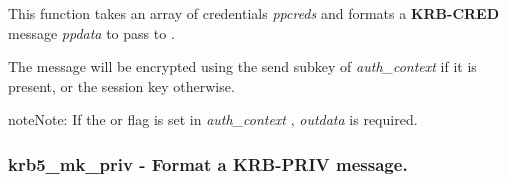 \documentclass[letterpaper,10pt,english]{sphinxmanual}
\begin{document}
This function takes an array of credentials \emph{ppcreds} and formats a \textbf{KRB-CRED} message \emph{ppdata} to pass to {\hyperref[appdev/refs/api/krb5_rd_cred:c.krb5_rd_cred]{}} .

The message will be encrypted using the send subkey of \emph{auth\_context} if it is present, or the session key otherwise.

\begin{notice}{note}{Note:}
If the {\hyperref[appdev/refs/macros/KRB5_AUTH_CONTEXT_RET_TIME:KRB5_AUTH_CONTEXT_RET_TIME]{}} or {\hyperref[appdev/refs/macros/KRB5_AUTH_CONTEXT_RET_SEQUENCE:KRB5_AUTH_CONTEXT_RET_SEQUENCE]{}} flag is set in \emph{auth\_context} , \emph{outdata} is required.
\end{notice}


\subsubsection{krb5\_mk\_priv -  Format a KRB-PRIV message.}
\label{appdev/refs/api/krb5_mk_priv:krb5-mk-priv-format-a-krb-priv-message}\label{appdev/refs/api/krb5_mk_priv::doc}

\begin{fulllineitems}
\label{appdev/refs/api/krb5_mk_priv:c.krb5_mk_priv}
\end{fulllineitems}
\end{document}
